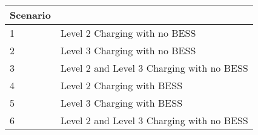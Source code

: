 \begin{tabularx}{\linewidth}{X | l}
\toprule
 Scenario &  \\
\midrule
        1 & Level 2 Charging with no BESS  \\
        2 & Level 3 Charging with no BESS  \\
        3 & Level 2 and Level 3 Charging with no BESS \\
        4 & Level 2 Charging with BESS  \\
        5 & Level 3 Charging with BESS \\
        6 & Level 2 and Level 3 Charging with no BESS \\
\bottomrule
\end{tabularx}
